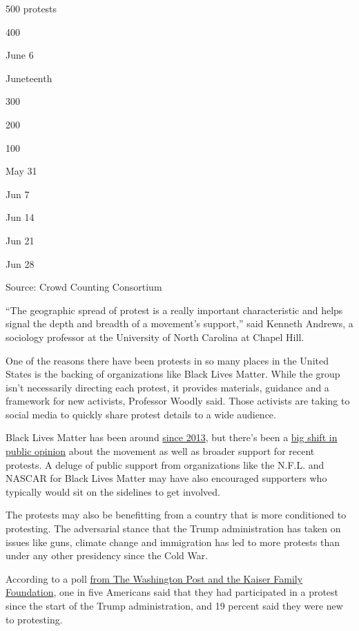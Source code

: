 500 protests

400

June 6

Juneteenth

300

200

100

May 31

Jun 7

Jun 14

Jun 21

Jun 28

Source: Crowd Counting Consortium

``The geographic spread of protest is a really important characteristic
and helps signal the depth and breadth of a movement's support,'' said
Kenneth Andrews, a sociology professor at the University of North
Carolina at Chapel Hill.

One of the reasons there have been protests in so many places in the
United States is the backing of organizations like Black Lives Matter.
While the group isn't necessarily directing each protest, it provides
materials, guidance and a framework for new activists, Professor Woodly
said. Those activists are taking to social media to quickly share
protest details to a wide audience.

Black Lives Matter has been around
\href{https://www.nytimes3xbfgragh.onion/2020/06/05/sunday-review/black-lives-matter-protests-floyd.html}{since
2013}, but there's been a
\href{https://www.nytimes3xbfgragh.onion/interactive/2020/06/10/upshot/black-lives-matter-attitudes.html}{big
shift in public opinion} about the movement as well as broader support
for recent protests. A deluge of public support from organizations like
the N.F.L. and NASCAR for Black Lives Matter may have also encouraged
supporters who typically would sit on the sidelines to get involved.

The protests may also be benefitting from a country that is more
conditioned to protesting. The adversarial stance that the Trump
administration has taken on issues like guns, climate change and
immigration has led to more protests than under any other presidency
since the Cold War.

According to a poll
\href{https://www.washingtonpost.com/news/national/wp/2018/04/06/feature/in-reaction-to-trump-millions-of-americans-are-joining-protests-and-getting-political/}{from
The Washington Post and the Kaiser Family Foundation}, one in five
Americans said that they had participated in a protest since the start
of the Trump administration, and 19 percent said they were new to
protesting.

